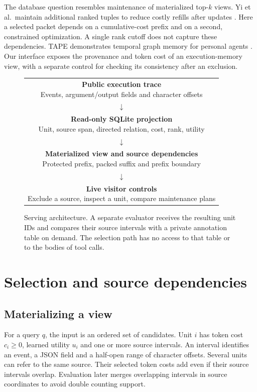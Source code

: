 \documentclass[conference]{IEEEtran}
\begin{document}
The database question resembles maintenance of materialized top-$k$ views. Yi et al.\ maintain additional ranked tuples to reduce costly refills after updates \cite{topk}. Here a selected packet depends on a cumulative-cost prefix and on a second, constrained optimization. A single rank cutoff does not capture these dependencies. TAPE demonstrates temporal graph memory for personal agents \cite{tape}. Our interface exposes the provenance and token cost of an execution-memory view, with a separate control for checking its consistency after an exclusion.

\begin{figure}[t]
\centering
\setlength{\fboxsep}{4pt}
\begin{tabular}{@{}c@{}}
\fcolorbox{forest}{white}{\parbox{.88\columnwidth}{\centering \textbf{Public execution trace}\\Events, argument/output fields and character offsets}}\\[-1pt]
$\downarrow$\\[-2pt]
\fcolorbox{forest}{white}{\parbox{.88\columnwidth}{\centering \textbf{Read-only SQLite projection}\\Unit, source span, directed relation, cost, rank, utility}}\\[-1pt]
$\downarrow$\\[-2pt]
\fcolorbox{forest}{white}{\parbox{.88\columnwidth}{\centering \textbf{Materialized view and source dependencies}\\Protected prefix, packed suffix and prefix boundary}}\\[-1pt]
$\downarrow$\\[-2pt]
\fcolorbox{forest}{white}{\parbox{.88\columnwidth}{\centering \textbf{Live visitor controls}\\Exclude a source, inspect a unit, compare maintenance plans}}\\
\end{tabular}
\caption{Serving architecture. A separate evaluator receives the resulting unit IDs and compares their source intervals with a private annotation table on demand. The selection path has no access to that table or to the bodies of tool calls.}
\label{fig:system}
\end{figure}

\section{Selection and source dependencies}

\subsection{Materializing a view}
For a query $q$, the input is an ordered set of candidates. Unit $i$ has token cost $c_i\geq 0$, learned utility $u_i$ and one or more source intervals. An interval identifies an event, a JSON field and a half-open range of character offsets. Several units can refer to the same source. Their selected token costs add even if their source intervals overlap. Evaluation later merges overlapping intervals in source coordinates to avoid double counting support.
\end{document}
